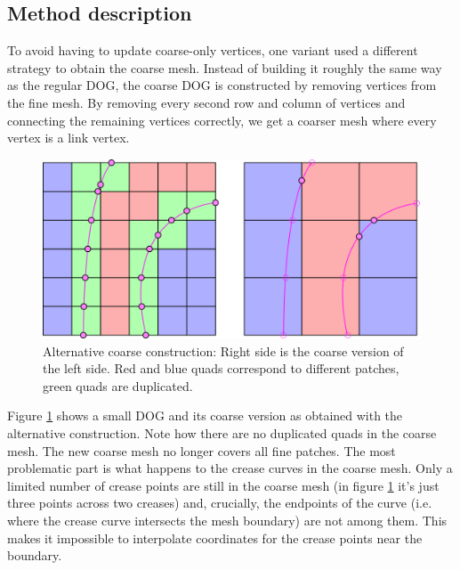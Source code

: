 \documentclass[a4paper,twoside,12pt,nochapterprefix]{scrbook}
\begin{document}
\subsection{Method description}
To avoid having to update coarse-only vertices, one variant used a different strategy to obtain the coarse mesh. Instead of building it roughly the same way as the regular DOG, the coarse DOG is constructed by removing vertices from the fine mesh. By removing every second row and column of vertices and connecting the remaining vertices correctly, we get a coarser mesh where every vertex is a link vertex.\newline
\begin{figure}
    \centering
    \includegraphics[width=0.75\linewidth]{figures/0321_alternate_coarse}
    \caption{Alternative coarse construction: Right side is the coarse version of the left side. Red and blue quads correspond to different patches, green quads are duplicated.}
    \label{fig:alt_coarse}
\end{figure}
Figure \ref{fig:alt_coarse} shows a small DOG and its coarse version as obtained with the alternative construction. Note how there are no duplicated quads in the coarse mesh. The new coarse mesh no longer covers all fine patches. The most problematic part is what happens to the crease curves in the coarse mesh. Only a limited number of crease points are still in the coarse mesh (in figure \ref{fig:alt_coarse} it's just three points across two creases) and, crucially, the endpoints of the curve (i.e. where the crease curve intersects the mesh boundary) are not among them. This makes it impossible to interpolate coordinates for the crease points near the boundary.\newline
\end{document}
